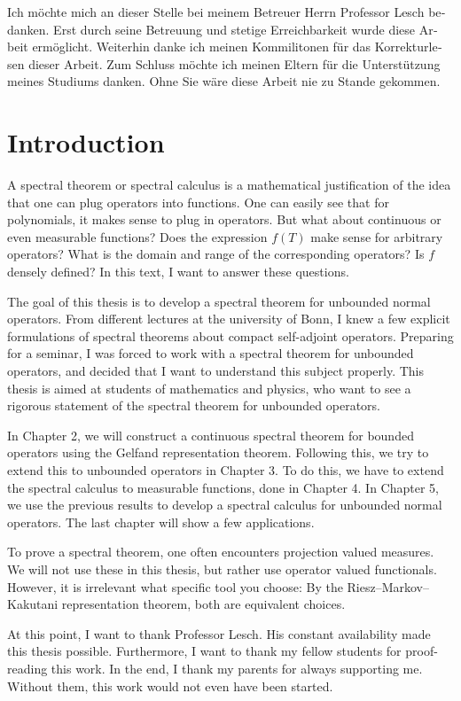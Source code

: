 \begin{otherlanguage}{ngerman}
Ich möchte mich an dieser Stelle bei meinem Betreuer Herrn Professor Lesch bedanken.
Erst durch seine Betreuung und stetige Erreichbarkeit wurde diese Arbeit ermöglicht.
Weiterhin danke ich meinen Kommilitonen für das Korrekturlesen dieser Arbeit. 
Zum Schluss möchte ich meinen Eltern für die Unterstützung meines Studiums danken.
Ohne Sie wäre diese Arbeit nie zu Stande gekommen.


\end{otherlanguage}

\newpage
\section*{Introduction}
A spectral theorem or spectral calculus is a mathematical justification 
of the idea that one can plug operators into functions. One can easily see
that for polynomials, it makes sense to plug in operators. But what about
continuous or even measurable functions? Does the expression $f(T)$ make 
sense for arbitrary operators? What is the domain and range of the corresponding
operators? Is $f$ densely defined? In this text, I want to answer these questions.

The goal of this thesis is to develop a spectral theorem for unbounded normal
operators. From different lectures at the university of Bonn, I knew a few explicit
formulations of spectral theorems about compact self-adjoint operators. Preparing
for a seminar, I was forced to work with a spectral theorem for unbounded operators, 
and decided that I want to understand this subject properly. This thesis is aimed
at students of mathematics and physics, who want to see a rigorous statement
of the spectral theorem for unbounded operators.

In Chapter 2, we will construct a continuous spectral theorem for bounded operators
using the Gelfand representation theorem. Following this, we try to extend this to unbounded
operators in Chapter 3. To do this, we have to extend the spectral calculus to measurable
functions, done in Chapter 4. In Chapter 5, we use the previous results to develop a spectral
calculus for unbounded normal operators. The last chapter will show a few applications.

To prove a spectral theorem, one often encounters projection valued measures. We will not 
use these in this thesis, but rather use operator valued functionals.
However, it is irrelevant what specific tool you choose:
By the Riesz--Markov--Kakutani representation theorem, both are equivalent choices.

At this point, I want to thank Professor Lesch. His constant availability made this thesis possible.
Furthermore, I want to thank my fellow students for proof-reading this work. In the end, I thank
my parents for always supporting me. Without them, this work would not even have been started.



